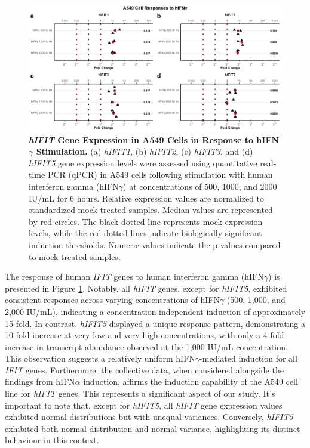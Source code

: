 \begin{figure}
    \centering
    \includegraphics[width=1\linewidth]{06. Chapter 1/Figs/01. Induction/02. a549_treat_ifng.pdf}
    \caption[\textit{hIFIT} Gene Expression in A549 Cells in Response to hIFN\(\gamma\) Stimulation.]{\textbf{\textit{hIFIT} Gene Expression in A549 Cells in Response to hIFN\(\gamma\) Stimulation.} (a) \textit{hIFIT1}, (b) \textit{hIFIT2}, (c) \textit{hIFIT3}, and (d) \textit{hIFIT5} gene expression levels were assessed using quantitative real-time PCR (qPCR) in A549 cells following stimulation with human interferon gamma (hIFN\(\gamma\)) at concentrations of 500, 1000, and 2000 IU/mL for 6 hours. Relative expression values are normalized to standardized mock-treated samples. Median values are represented by red circles. The black dotted line represents mock expression levels, while the red dotted lines indicate biologically significant induction thresholds. Numeric values indicate the p-values compared to mock-treated samples.}
    \label{fig:A549 Response to hIFNg}
\end{figure}

The response of human \textit{IFIT} genes to human interferon gamma (hIFN\(\gamma\)) is presented in Figure \ref{fig:A549 Response to hIFNg}. Notably, all \textit{hIFIT} genes, except for \textit{hIFIT5}, exhibited consistent responses across varying concentrations of hIFN\(\gamma\) (500, 1,000, and 2,000 IU/mL), indicating a concentration-independent induction of approximately 15-fold. In contrast, \textit{hIFIT5} displayed a unique response pattern, demonstrating a 10-fold increase at very low and very high concentrations, with only a 4-fold increase in transcript abundance observed at the 1,000 IU/mL concentration. This observation suggests a relatively uniform hIFN\(\gamma\)-mediated induction for all \textit{IFIT} genes. Furthermore, the collective data, when considered alongside the findings from hIFN\(\alpha\) induction, affirms the induction capability of the A549 cell line for \textit{hIFIT} genes. This represents a significant aspect of our study. It's important to note that, except for \textit{hIFIT5}, all \textit{hIFIT} gene expression values exhibited normal distributions but with unequal variances. Conversely, \textit{hIFIT5} exhibited both normal distribution and normal variance, highlighting its distinct behaviour in this context.

